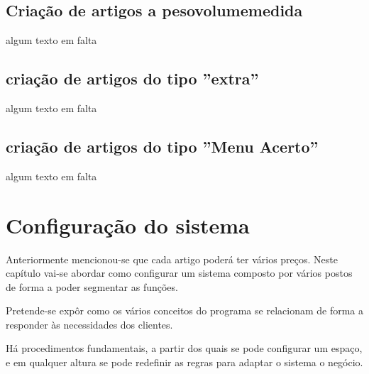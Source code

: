 \documentclass[a4paper,11pt,openany]{memoir}
\begin{document}
\section{Criação de artigos a peso\/volume\/medida}
\label{sec:pesomedida}

\begin{HUGE}
algum texto em falta
\end{HUGE}


\section{criação de artigos do tipo ''extra''}

\begin{huge}
algum texto em falta
\end{huge}


\section{criação de artigos do tipo ''Menu Acerto''}

\begin{huge}
algum texto em falta
\end{huge}



\chapter{Configuração do sistema}

Anteriormente mencionou-se que cada artigo poderá ter vários preços. Neste capítulo vai-se abordar
como configurar um sistema composto por vários postos de forma a poder segmentar as funções.

Pretende-se expôr como os vários conceitos do programa se relacionam de forma a responder às necessidades dos clientes.




Há procedimentos fundamentais, a partir dos quais se pode configurar um espaço, e em 
qualquer altura se pode redefinir as regras para adaptar o sistema o negócio.
\end{document}

